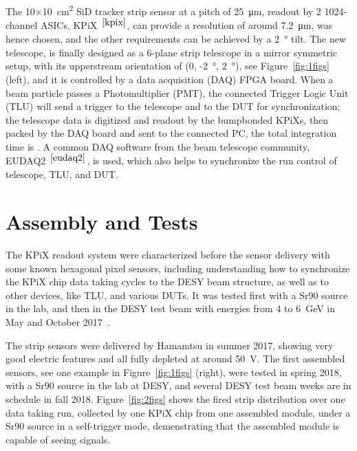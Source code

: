 The 10$\times$\SI{10}{\square\centi\metre} SiD tracker strip sensor at a pitch of \SI{25}{\micro\metre}, readout by 2 1024-channel ASICs, KPiX~$^{\cite{kpix}}$, can provide a resolution of around \SI{7.2}{\micro\metre},
was hence chosen, and the other requirements can be achieved by a \SI{2}{\degree} tilt.
The new telescope, \lycoris is finally designed as a 6-plane strip telescope in a mirror symmetric setup, with its upperstream orientation of (0, -\SI{2}{\degree}, \SI{2}{\degree}), see Figure~\ref{fig:1figs} (left), and it is controlled by a data acquisition (DAQ) FPGA board.
When a beam particle passes a Photomultiplier (PMT), the connected Trigger Logic Unit (TLU) will send a trigger to the telescope and to the DUT for synchronization;
the telescope data is digitized and readout by the bumpbonded KPiXs, then packed by the DAQ board and sent to the connected PC, the total integration time is .
A common DAQ software from the beam telescope community, EUDAQ2~$^{\cite{eudaq2}}$, is used, which also helps to synchronize the run control of telescope, TLU, and DUT.

\section*{Assembly and Tests}

The KPiX readout system were characterized before the sensor delivery with some known hexagonal pixel sensors,
including understanding how to synchronize the KPiX chip data taking cycles to the DESY beam structure, as well as to other devices, like TLU, and various DUTs.
It was tested first with a Sr90 source in the lab, and then in the DESY test beam with energies from 4 to \SI{6}{\GeV} in May and October 2017~\cite{lycoris1}.

The strip sensors were delivered by Hamamtsu in summer 2017, showing very good electric features and all fully depleted at around \SI{50}{\volt}.
The first assembled sensors, see one example in Figure~\ref{fig:1figs} (right), were tested in spring 2018, with a Sr90 source in the lab at DESY, and several DESY test beam weeks are in schedule in fall 2018.
Figure~\ref{fig:2figs} shows the fired strip distribution over one data taking run, collected by one KPiX chip from one assembled module, under a Sr90 source in a self-trigger mode,
demenstrating that the assembled module is capable of seeing signals.

